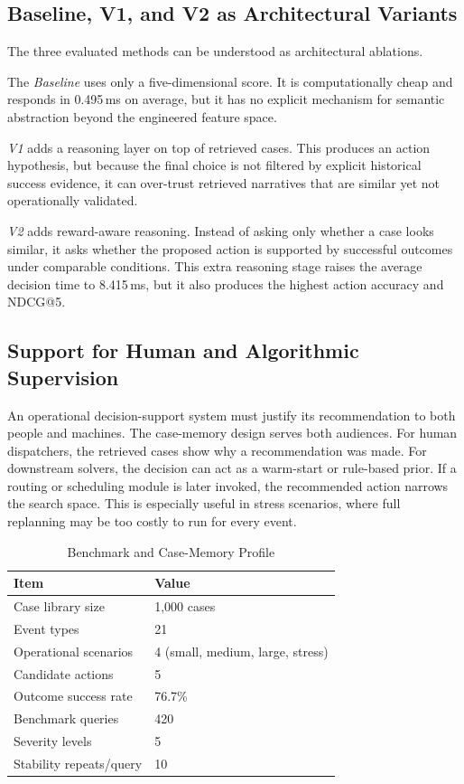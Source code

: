 \documentclass[conference]{IEEEtran}
\begin{document}
\subsection{Baseline, V1, and V2 as Architectural Variants}

The three evaluated methods can be understood as architectural ablations.

The \textit{Baseline} uses only a five-dimensional score. It is computationally cheap and responds in 0.495\,ms on average, but it has no explicit mechanism for semantic abstraction beyond the engineered feature space.

\textit{V1} adds a reasoning layer on top of retrieved cases. This produces an action hypothesis, but because the final choice is not filtered by explicit historical success evidence, it can over-trust retrieved narratives that are similar yet not operationally validated.

\textit{V2} adds reward-aware reasoning. Instead of asking only whether a case looks similar, it asks whether the proposed action is supported by successful outcomes under comparable conditions. This extra reasoning stage raises the average decision time to 8.415\,ms, but it also produces the highest action accuracy and NDCG@5.

\subsection{Support for Human and Algorithmic Supervision}

An operational decision-support system must justify its recommendation to both people and machines. The case-memory design serves both audiences. For human dispatchers, the retrieved cases show why a recommendation was made. For downstream solvers, the decision can act as a warm-start or rule-based prior. If a routing or scheduling module is later invoked, the recommended action narrows the search space. This is especially useful in stress scenarios, where full replanning may be too costly to run for every event.

\begin{table}[t]
\caption{Benchmark and Case-Memory Profile}
\label{tab:profile}
\centering
\small
\begin{tabular}{ll}
\toprule
\textbf{Item} & \textbf{Value} \\
\midrule
Case library size & 1,000 cases \\
Event types & 21 \\
Operational scenarios & 4 (small, medium, large, stress) \\
Candidate actions & 5 \\
Outcome success rate & 76.7\% \\
Benchmark queries & 420 \\
Severity levels & 5 \\
Stability repeats/query & 10 \\
\bottomrule
\end{tabular}
\end{table}
\end{document}
